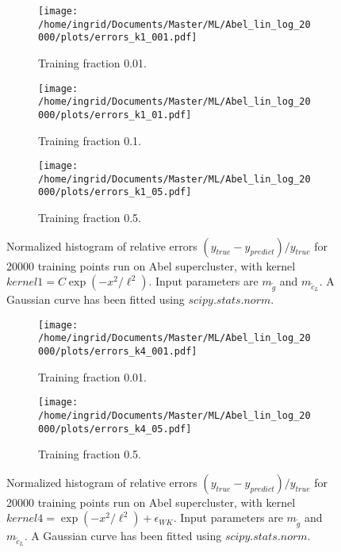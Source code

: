\documentclass[twoside,english]{uiofysmaster}
\begin{document}

\begin{figure}
\centering
	\begin{subfigure}[b]{0.65\textwidth}
	\texttt{[image: /home/ingrid/Documents/Master/ML/Abel\_lin\_log\_20000/plots/errors\_k1\_001.pdf]}
	\caption{Training fraction 0.01.}
	\end{subfigure}
	\begin{subfigure}[b]{0.65\textwidth}
	\texttt{[image: /home/ingrid/Documents/Master/ML/Abel\_lin\_log\_20000/plots/errors\_k1\_01.pdf]}
	\caption{Training fraction 0.1.}
	\end{subfigure}
	\begin{subfigure}[b]{0.65\textwidth}
	\texttt{[image: /home/ingrid/Documents/Master/ML/Abel\_lin\_log\_20000/plots/errors\_k1\_05.pdf]}
	\caption{Training fraction 0.5.}
	\end{subfigure}
\caption{Normalized histogram of relative errors $(y_{true} - y_{predict})/y_{true}$ for 20000 training points run on Abel supercluster, with kernel $kernel1 = C \exp(-x^2/\ell^2)$. Input parameters are $m_{\tilde{g}}$ and $m_{\tilde{c}_L}$. A Gaussian curve has been fitted using $scipy.stats.norm$.}
\label{Fig:: Error histograms k1 abel 20k}
\end{figure}


\begin{figure}
\centering
	\begin{subfigure}[b]{0.65\textwidth}
	\texttt{[image: /home/ingrid/Documents/Master/ML/Abel\_lin\_log\_20000/plots/errors\_k4\_001.pdf]}
	\caption{Training fraction 0.01.}
	\end{subfigure}
	\begin{subfigure}[b]{0.65\textwidth}
	\texttt{[image: /home/ingrid/Documents/Master/ML/Abel\_lin\_log\_20000/plots/errors\_k4\_05.pdf]}
	\caption{Training fraction 0.5.}
	\end{subfigure}
\caption{Normalized histogram of relative errors $(y_{true} - y_{predict})/y_{true}$ for 20000 training points run on Abel supercluster, with kernel $kernel4 = \exp(-x^2/\ell^2) + \epsilon_{WK}$. Input parameters are $m_{\tilde{g}}$ and $m_{\tilde{c}_L}$. A Gaussian curve has been fitted using $scipy.stats.norm$.}
\label{Fig:: Error histograms k4 abel 20k}
\end{figure}
\end{document}
